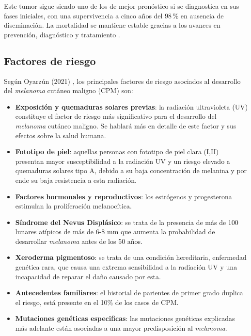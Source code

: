 Este tumor sigue siendo uno de los de mejor pronóstico si se diagnostica en sus fases iniciales, con una supervivencia a cinco años del 98\,\% en ausencia de diseminación. La mortalidad se mantiene estable gracias a los avances en prevención, diagnóstico y tratamiento \cite{EpidemiologiaCancerPiel}.

\subsection{\textbf{Factores de riesgo}}
Según Oyarzún (2021) \cite{Oyarzun_2021}, los principales factores de riesgo asociados al desarrollo del \textit{melanoma} cutáneo maligno (CPM) son:

\begin{itemize}
    \item \textbf{Exposición y quemaduras solares previas}: la radiación ultravioleta (UV) constituye el factor de riesgo más significativo para el desarrollo del \textit{melanoma} cutáneo maligno. Se hablará más en detalle de este factor y sus efectos sobre la salud humana.
    
    \item \textbf{Fototipo de piel}: aquellas personas con fototipo de piel clara (I,II) presentan mayor susceptibilidad a la radiación UV y un riesgo elevado a quemaduras solares tipo A,  debido a su baja concentración de melanina y por ende su baja resistencia a esta radiación.

    \item \textbf{Factores hormonales y reproductivos}: 
    los estrógenos y progesterona estimulan la proliferación melanocítica.

    \item \textbf{Síndrome del Nevus Displásico}:
    se trata de la presencia de más de 100 lunares atípicos de más de 6-8 mm que aumenta la probabilidad de desarrollar \textit{melanoma} antes de los 50 años.

    \item \textbf{Xeroderma pigmentoso}: se trata de una condición hereditaria, enfermedad genética rara, que causa una extrema sensibilidad a la radiación UV y una incapacidad de reparar el daño causado por esta.
    \item \textbf{Antecedentes familiares}: el historial de parientes de primer grado duplica el riesgo, está presente en el 10\% de los casos de CPM.
    \item \textbf{Mutaciones genéticas especificas}: las mutaciones genéticas explicadas más adelante están asociadas a una mayor predisposición al \textit{melanoma}.
\end{itemize}



